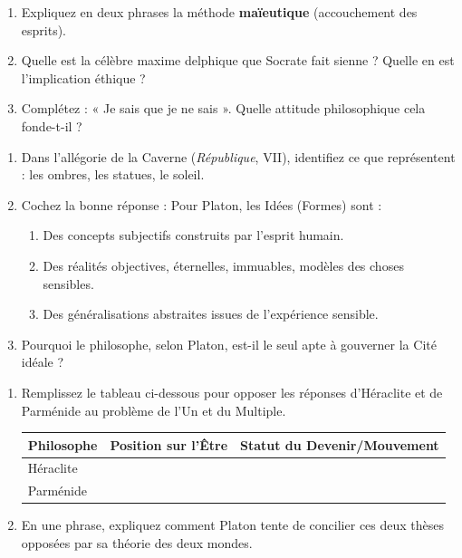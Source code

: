 \documentclass[11pt]{article}
\begin{document}
\begin{exercice}
\begin{enumerate}
    \item Expliquez en deux phrases la méthode \textbf{maïeutique} (accouchement des esprits).
    \item Quelle est la célèbre maxime delphique que Socrate fait sienne ? Quelle en est l'implication éthique ?
    \item Complétez : « Je sais que je ne sais \underline{\hspace{3cm}} ». Quelle attitude philosophique cela fonde-t-il ?
\end{enumerate}
\end{exercice}

\begin{exercice}
\begin{enumerate}
    \item Dans l'allégorie de la Caverne (\emph{République}, VII), identifiez ce que représentent : les ombres, les statues, le soleil.
    \item Cochez la bonne réponse : Pour Platon, les Idées (Formes) sont :
    \begin{enumerate}
        \item Des concepts subjectifs construits par l'esprit humain.
        \item Des réalités objectives, éternelles, immuables, modèles des choses sensibles.
        \item Des généralisations abstraites issues de l'expérience sensible.
    \end{enumerate}
    \item Pourquoi le philosophe, selon Platon, est-il le seul apte à gouverner la Cité idéale ?
\end{enumerate}
\end{exercice}

\begin{exercice}
\begin{enumerate}
    \item Remplissez le tableau ci-dessous pour opposer les réponses d'Héraclite et de Parménide au problème de l'Un et du Multiple.
    \begin{tabular}{|l|c|c|}
    \hline
    \textbf{Philosophe} & \textbf{Position sur l'Être} & \textbf{Statut du Devenir/Mouvement} \\
    \hline
    Héraclite &  &  \\
    \hline
    Parménide &  &  \\
    \hline
    \end{tabular}
    \item En une phrase, expliquez comment Platon tente de concilier ces deux thèses opposées par sa théorie des deux mondes.
\end{enumerate}
\end{exercice}
\end{document}
